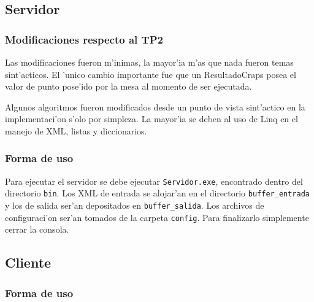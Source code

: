 \subsection{Servidor}
\subsubsection{Modificaciones respecto al TP2}
Las modificaciones fueron m'inimas, la mayor'ia m'as que nada fueron temas sint'acticos. El 'unico cambio importante fue que un ResultadoCraps posea el valor de punto pose'ido por la mesa al momento de ser ejecutada.

Algunos algoritmos fueron modificados desde un punto de vista sint'actico en la implementaci'on s'olo por simpleza. La mayor'ia se deben al uso de Linq en el manejo de XML, listas y diccionarios.

\subsubsection{Forma de uso}
Para ejecutar el servidor se debe ejecutar \verb|Servidor.exe|, encontrado dentro del directorio \verb|bin|. Los XML de entrada se alojar'an en el directorio \verb|buffer_entrada| y los de salida ser'an depositados en \verb|buffer_salida|. Los archivos de configuraci'on ser'an tomados de la carpeta \verb|config|. Para finalizarlo simplemente cerrar la consola.



\subsection{Cliente}
\subsubsection{Forma de uso}
